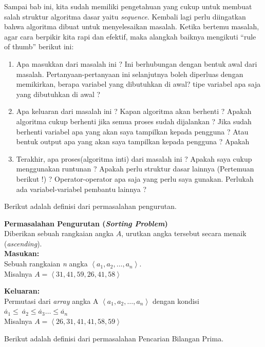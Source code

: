 Sampai bab ini, kita sudah memiliki pengetahuan yang cukup untuk membuat salah struktur algoritma dasar yaitu \textit{sequence}. Kembali lagi perlu diingatkan bahwa algoritma dibuat untuk menyelesaikan masalah. Ketika bertemu masalah, agar cara berpikir kita rapi dan efektif, maka alangkah baiknya mengikuti ``rule of thumb'' berikut ini: 
\begin{enumerate}
	\item Apa masukkan dari masalah ini ? Ini berhubungan dengan bentuk awal dari  masalah. Pertanyaan-pertanyaan ini selanjutnya boleh diperluas dengan memikirkan, berapa variabel yang dibutuhkan di awal? tipe variabel apa saja yang dibutuhkan  di awal ?
	\item Apa keluaran dari masalah ini ? Kapan algoritma akan berhenti ? Apakah algoritma cukup berhenti jika semua proses sudah dijalankan ?  Jika sudah berhenti variabel apa yang akan saya tampilkan kepada pengguna ? Atau bentuk output apa yang akan saya tampilkan kepada pengguna ?  Apakah 
	\item Terakhir, apa proses(algoritma inti) dari masalah ini ? Apakah saya cukup menggunakan runtunan ? Apakah perlu struktur dasar lainnya (Pertemuan berikut !) ? Operator-operator apa saja yang perlu saya gunakan. Perlukah ada variabel-variabel pembantu lainnya ?
\end{enumerate}
Berikut adalah definisi dari permasalahan pengurutan.
\begin{contoh}
\label{cth:pengurutan}
\textbf{Permasalahan Pengurutan (\textit{Sorting Problem})}\\
Diberikan sebuah rangkaian angka $A$, urutkan angka tersebut secara menaik (\textit{ascending}).\\
\textbf{Masukan:}\\
Sebuah rangkaian \textit{n} angka $\left\langle a_{1},a_{2},\ldots,a_{n} \right\rangle$.\\
Misalnya $A = \left\langle 31,41,59,26,41,58 \right\rangle$

\textbf{Keluaran:}\\ 
Permutasi dari \textit{array} angka A $\left\langle a_{1},a_{2},\ldots,a_{n}\right\rangle$ dengan kondisi $\acute{a_{1}} \leq\ \acute{a_{2}} \leq \acute{a_{3}} \ldots \leq \acute{a_{n}}$ \\
Misalnya $A = \left\langle 26,31,41,41,58,59 \right\rangle$
\end{contoh}
Berikut adalah definisi dari permasalahan Pencarian Bilangan Prima.
